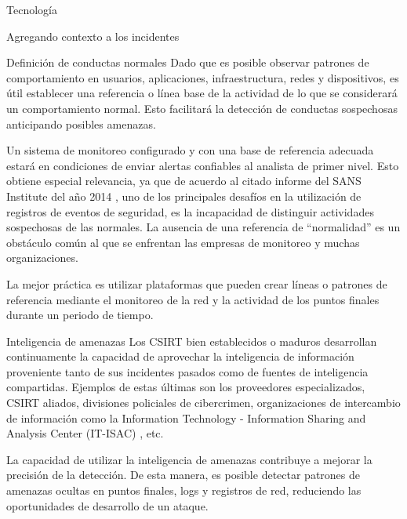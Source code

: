 \begin{section}{Tecnología}
\begin{subsection}{Agregando contexto a los incidentes}
        \end{subsection}
        \begin{subsection}{Definición de conductas normales}
        Dado que es posible observar patrones de comportamiento en usuarios, aplicaciones, infraestructura, redes y dispositivos, es útil establecer una referencia o línea base de la actividad de lo que se considerará un comportamiento normal. Esto facilitará la detección de conductas sospechosas anticipando posibles amenazas. \par
        Un sistema de monitoreo configurado y con una base de referencia adecuada estará en condiciones de enviar alertas confiables al analista de primer nivel. Esto obtiene especial relevancia, ya que de acuerdo al citado informe del SANS Institute del año 2014 \cite{sans_1}, uno de los principales desafíos en la utilización de registros de eventos de seguridad, es la incapacidad de distinguir actividades sospechosas de las normales. La ausencia de una referencia de “normalidad” es un obstáculo común al que se enfrentan las empresas de monitoreo y muchas organizaciones. \par
        La mejor práctica es utilizar plataformas que pueden crear líneas o patrones de referencia mediante el monitoreo de la red y la actividad de los puntos finales durante un periodo de tiempo.
        \end{subsection}
        
        \begin{subsection}{Inteligencia de amenazas}
        Los CSIRT bien establecidos o maduros desarrollan continuamente la capacidad de aprovechar la inteligencia de información proveniente tanto de sus incidentes pasados como de fuentes de inteligencia compartidas. Ejemplos de estas últimas son los proveedores especializados, CSIRT aliados, divisiones policiales de cibercrimen, organizaciones de intercambio de información como la Information Technology - Information Sharing and Analysis Center (IT-ISAC) \cite{it_isac}, etc. \par
        La capacidad de utilizar la inteligencia de amenazas contribuye a mejorar la precisión de la detección. De esta manera, es posible detectar patrones de amenazas ocultas en puntos finales, logs y registros de red, reduciendo las oportunidades de desarrollo de un ataque.
        \end{subsection}
      

\end{section}
